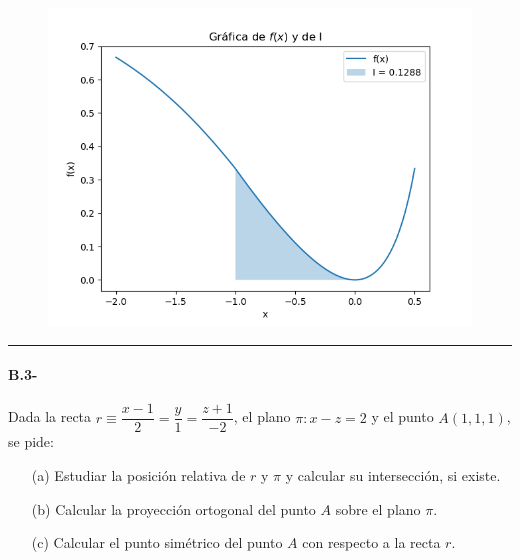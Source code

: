 \begin{enumerate}
    \begin{figure}[!h]
        \centering
        \includegraphics[scale=.6]{EvAU_B2.png}
        \label{fig:enter-label2}
    \end{figure}  
\end{enumerate}

\noindent\rule{\textwidth}{0.5pt}
\newpage
\begin{mybox}
    \paragraph{B.3-} Dada la recta $r\equiv \dfrac{x-1}{2}=\dfrac{y}{1}=\dfrac{z+1}{-2}$, el plano $ \pi : x-z=2$ y el punto $ A(1,1,1)$, se pide:
    \begin{enumerate}
        \item[(a)] Estudiar la posición relativa de $r$ y $\pi$ y calcular su intersección, si existe. 
        \item[(b)] Calcular la proyección ortogonal del punto $A$ sobre el plano $\pi$. 
        \item[(c)] Calcular el punto simétrico del punto $A$ con respecto a la recta $r$. 
    \end{enumerate}
\end{mybox}
